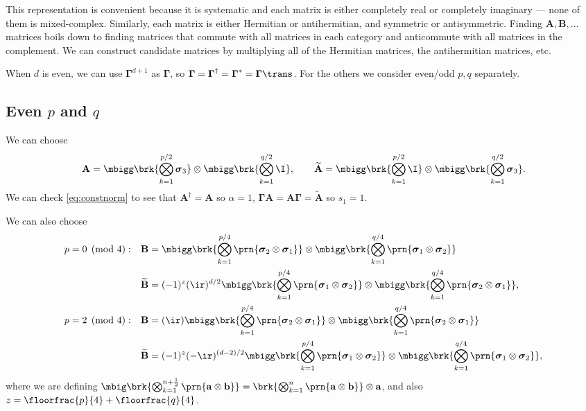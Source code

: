 \documentclass[11pt]{article}
\newcommand{\Gammab}{\boldsymbol{\Gamma}}
\newcommand{\A}{\mathbf{A}}
\newcommand{\B}{\mathbf{B}}
\newcommand{\At}{\widetilde{\mathbf{A}}}
\newcommand{\Bt}{\widetilde{\mathbf{B}}}
\newcommand{\sigmab}{\boldsymbol{\sigma}}
\begin{document}
This representation is convenient because it is systematic and each matrix is either completely real or completely imaginary --- none of them is mixed-complex.
Similarly, each matrix is either Hermitian or antihermitian, and symmetric or antisymmetric.
Finding $\A, \B, \dots$ matrices boils down to finding matrices that commute with all matrices in each category and anticommute with all matrices in the complement.
We can construct candidate matrices by multiplying all of the Hermitian matrices, the antihermitian matrices, etc.

When $d$ is even, we can use $\Gammab^{d+1}$ as $\Gammab$, so $\Gammab = \Gammab^\dag = \Gammab^\ast =\Gammab\trans$.
For the others we consider even/odd $p,q$ separately.


\subsection{Even \texorpdfstring{$p$ and $q$}{p and q}}\label{sec:eveneven}

We can choose
%
\begin{equation*}
  \A = \mbigg\brk{\bigotimes_{k=1}^{p/2} \sigmab_3}
        \otimes \mbigg\brk{\bigotimes_{k=1}^{q/2} \I},
  \qquad
  \At = \mbigg\brk{\bigotimes_{k=1}^{p/2} \I}
        \otimes \mbigg\brk{\bigotimes_{k=1}^{q/2} \sigmab_3}.
\end{equation*}
%
We can check \cref{eq:constnorm} to see that $\A^\dag = \A$ so $\alpha=1$, $\Gammab \A = \A \Gammab = \At$ so $s_1 = 1$.

We can also choose
%
\begin{equation*}
\begin{aligned}
  p &= 0 \pmod 4: &
  \B &= \mbigg\brk{\bigotimes_{k=1}^{p/4} \prn{\sigmab_2 \otimes \sigmab_1}} \otimes
        \mbigg\brk{\bigotimes_{k=1}^{q/4} \prn{\sigmab_1 \otimes \sigmab_2}} \\ &&
  \Bt &= (-1)^{z} (\ir)^{d/2}
        \mbigg\brk{\bigotimes_{k=1}^{p/4} \prn{\sigmab_1 \otimes \sigmab_2}} \otimes
        \mbigg\brk{\bigotimes_{k=1}^{q/4} \prn{\sigmab_2 \otimes \sigmab_1}},
  \\
  p &= 2 \pmod 4: &
  \B &= (\ir)
        \mbigg\brk{\bigotimes_{k=1}^{p/4} \prn{\sigmab_2 \otimes \sigmab_1}} \otimes
        \mbigg\brk{\bigotimes_{k=1}^{q/4} \prn{\sigmab_2 \otimes \sigmab_1}} \\ &&
  \Bt &= (-1)^{z} (-\ir)^{(d-2)/2}
        \mbigg\brk{\bigotimes_{k=1}^{p/4} \prn{\sigmab_1 \otimes \sigmab_2}} \otimes
        \mbigg\brk{\bigotimes_{k=1}^{q/4} \prn{\sigmab_1 \otimes \sigmab_2}},
\end{aligned}
\end{equation*}
%
where we are defining \( \mbig\brk{\bigotimes_{k=1}^{n+\frac{1}{2}} \prn{\mathbf{a} \otimes \mathbf{b}}}
= \brk{\bigotimes_{k=1}^{n} \prn{\mathbf{a} \otimes \mathbf{b}}} \otimes \mathbf{a} \),
and also $z = \floorfrac{p}{4} + \floorfrac{q}{4}$.
\end{document}

